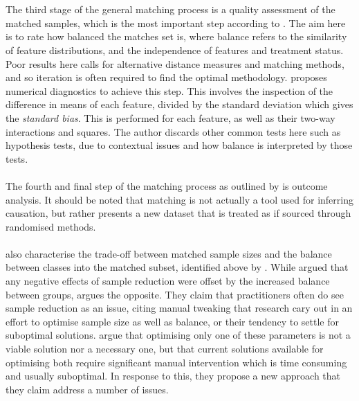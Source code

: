 {\\\\
The third stage of the general matching process is a quality assessment of the matched samples, which is the most important step according to \cite{stuart2010matching}. The aim here is to rate how balanced the matches set is, where balance refers to the similarity of feature distributions, and the independence of features and treatment status. Poor results here calls for alternative distance measures and matching methods, and so iteration is often required to find the optimal methodology. \cite{stuart2010matching} proposes numerical diagnostics to achieve this step. This involves the inspection of the difference in means of each feature, divided by the standard deviation which gives the {\it standard bias}. This is performed for each feature, as well as their two-way interactions and squares. The author discards other common tests here such as hypothesis tests, due to contextual issues and how balance is interpreted by those tests. 
 \\\\ 
The fourth and final step of the matching process as outlined by \cite{stuart2010matching} is outcome analysis. It should be noted that matching is not actually a tool used for inferring causation, but rather presents a new dataset that is treated as if sourced through randomised methods.  
\\\\
\cite{king2014balance} also characterise the trade-off between matched sample sizes and the balance between classes into the matched subset, identified above by \cite{stuart2010matching}. While \cite{stuart2010matching} argued that any negative effects of sample reduction were offset by the increased balance between groups, \cite{king2014balance} argues the opposite. They claim that practitioners often do see sample reduction as an issue, citing manual tweaking that research cary out in an effort to optimise sample size as well as balance, or their tendency to settle for suboptimal solutions. \cite{king2014balance} argue that optimising only one of these parameters is not a viable solution nor a necessary one, but that current solutions available for optimising both require significant manual intervention which is time consuming and usually suboptimal. In response to this, they propose a new approach that they claim address a number of issues. \\\\
}
